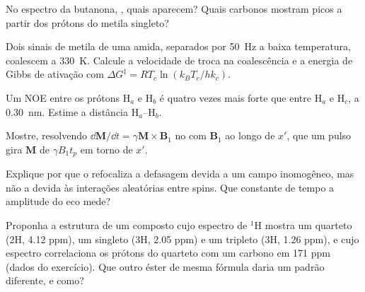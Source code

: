 \begin{exercise}[$\star\star$]\label{exo:b3:advanced-nmr:7}
No espectro  da butanona, , quais  aparecem?
Quais carbonos mostram picos  a partir dos prótons do metila singleto?
\end{exercise}

\begin{exercise}[$\star\star$]\label{exo:b3:advanced-nmr:8}
Dois sinais de metila de uma amida, separados por \qty{50}{Hz} a baixa temperatura,
coalescem a \qty{330}{K}. Calcule a velocidade de troca na coalescência e a energia de
Gibbs de ativação com $\Delta G^\ddagger = RT_c\ln(k_BT_c/hk_c)$.
\end{exercise}

\begin{exercise}[$\star\star$]\label{exo:b3:advanced-nmr:9}
Um NOE entre os prótons H$_a$ e H$_b$ é quatro vezes mais forte que entre H$_a$ e
H$_c$, a \qty{0.30}{nm}. Estime a distância H$_a$--H$_b$.
\end{exercise}

\begin{exercise}[$\star\star\star$]\label{exo:b3:advanced-nmr:10}
Mostre, resolvendo $\dd\mathbf M/\dd t = \gamma\mathbf M\times\mathbf B_1$ no  com $\mathbf B_1$ ao longo de $x'$, que um pulso gira $\mathbf M$ de $\gamma B_1t_p$ em torno de $x'$.
\end{exercise}

\begin{exercise}[$\star\star\star$]\label{exo:b3:advanced-nmr:11}
Explique por que o  refocaliza a defasagem devida a um campo
inomogêneo, mas não a devida às interações aleatórias entre spins. Que
constante de tempo a amplitude do eco mede?
\end{exercise}

\begin{exercise}[$\star\star\star$]\label{exo:b3:advanced-nmr:12}
Proponha a estrutura de um composto  cujo espectro de ${}^1$H mostra um
quarteto (2H, 4.12 ppm), um singleto (3H, 2.05 ppm) e um tripleto (3H,
1.26 ppm), e cujo espectro  correlaciona os prótons do quarteto com um
carbono em 171 ppm (dados do exercício). Que outro éster de mesma fórmula
daria um padrão  diferente, e como?
\end{exercise}

